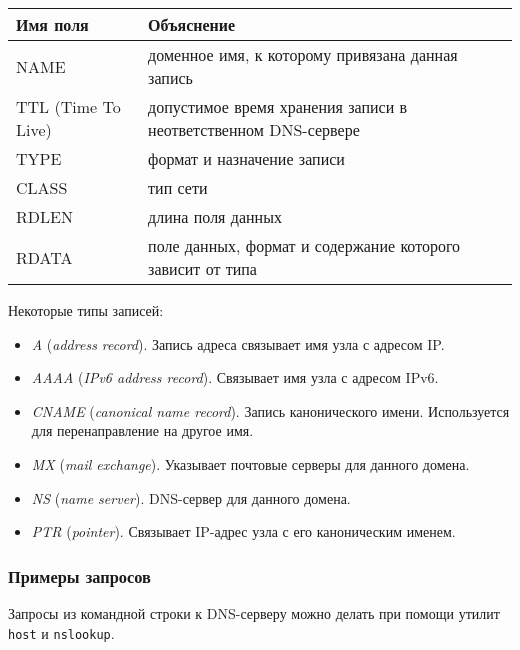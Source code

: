\begin{center}
  \begin{tabular}{lp{9cm}}
    \toprule
    Имя поля & Объяснение \\
    \midrule
    NAME & доменное имя, к которому привязана данная запись \\
    TTL (Time To Live) & допустимое время хранения записи в неответственном DNS-сервере \\
    TYPE & формат и назначение записи \\
    CLASS & тип сети \\
    RDLEN & длина поля данных \\
    RDATA & поле данных, формат и содержание которого зависит от типа \\
    \bottomrule
  \end{tabular}
\end{center}

Некоторые типы записей:
\begin{itemize}
  \item \emph{A} (\emph{address record}). Запись адреса связывает имя узла с адресом IP.
  \item \emph{AAAA} (\emph{IPv6 address record}). Связывает имя узла с адресом IPv6.
  \item \emph{CNAME} (\emph{canonical name record}). Запись канонического имени. Используется для перенаправление на другое имя.
  \item \emph{MX} (\emph{mail exchange}). Указывает почтовые серверы для данного домена.
  \item \emph{NS} (\emph{name server}). DNS-сервер для данного домена.
  \item \emph{PTR} (\emph{pointer}). Связывает IP-адрес узла с его каноническим именем.
\end{itemize}

\subsubsection{Примеры запросов}

Запросы из командной строки к DNS-серверу можно делать при помощи утилит \lstinline{host} и \lstinline{nslookup}.

